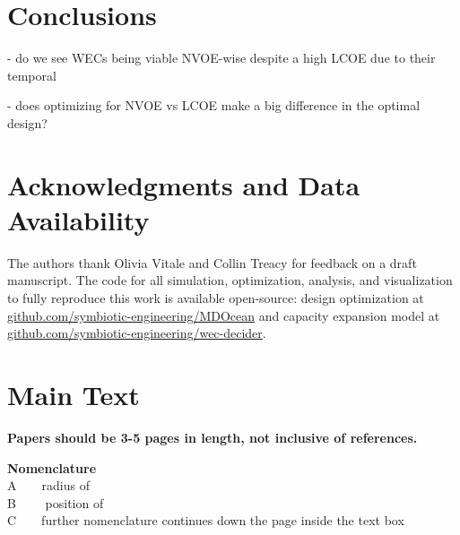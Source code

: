 \documentclass[10pt,twoside]{article}
\begin{document}
\lipsum[1-3]

\section{Conclusions}
\lipsum[1]

- do we see WECs being viable NVOE-wise despite a high LCOE due to their temporal

- does optimizing for NVOE vs LCOE make a big difference in the optimal design?

\section*{Acknowledgments and Data Availability}
The authors thank Olivia Vitale and Collin Treacy for feedback on a draft manuscript. The code for all simulation, optimization, analysis, and visualization to fully reproduce this work is available open-source: design optimization at \url{github.com/symbiotic-engineering/MDOcean} and capacity expansion model at \url{github.com/symbiotic-engineering/wec-decider}.

\clearpage
\section{Main Text}
\textbf{\textcolor[HTML]{70AD47}{Papers should be 3-5 pages in length, not inclusive of references. }} \hfill

\vspace{1\baselineskip}

\begin{framed}
\textbf{Nomenclature} \\
\normalsize    
    A\ \ \ \ radius of \\    
    B \ \ \ \ position of \\    
    C\ \ \ \ further nomenclature continues down the page inside the text box \\
\end{framed}


\end{document}

